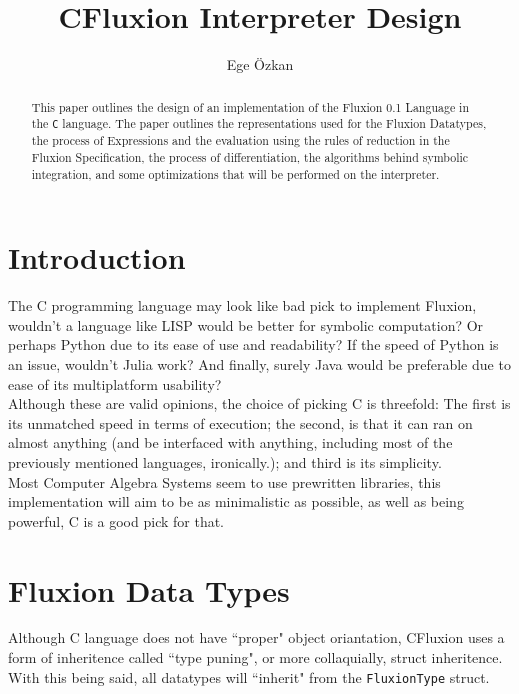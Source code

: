 \documentclass[11pt,a4paper]{article}
\author{Ege Özkan}
\title{CFluxion Interpreter Design}
\newcommand{\code}[1]{\texttt{#1}}
\begin{document}
\maketitle

\begin{abstract}
This paper outlines the design of an implementation of the Fluxion 0.1 Language in the \code{C} language. The paper outlines the representations used for the Fluxion Datatypes, the process of Expressions and the evaluation using the rules of reduction in the Fluxion Specification, the process of differentiation, the algorithms behind symbolic integration, and some optimizations that will be performed on the interpreter.
\end{abstract}

\section{Introduction}

The C programming language may look like bad pick to implement Fluxion, wouldn't a language like LISP would be better for symbolic computation? Or perhaps Python due to its ease of use and readability? If the speed of Python is an issue, wouldn't Julia work? And finally, surely Java would be preferable due to ease of its multiplatform usability?\\

Although these are valid opinions, the choice of picking C is threefold: The first is its unmatched speed in terms of execution; the second, is that it can ran on almost anything (and be interfaced with anything, including most of the previously mentioned languages, ironically.); and third is its simplicity.\\

Most Computer Algebra Systems seem to use prewritten libraries, this implementation will aim to be as minimalistic as possible, as well as being powerful, C is a good pick for that.\\

\section{Fluxion Data Types}

Although C language does not have ``proper" object oriantation, CFluxion uses a form of inheritence called ``type puning", or more collaquially, struct inheritence. With this being said, all datatypes will ``inherit" from the \code{FluxionType} struct.
\end{document}
